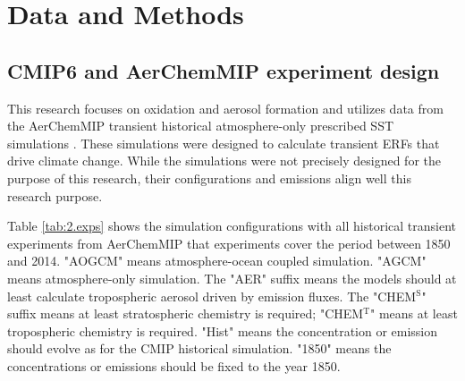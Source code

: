 
\chapter{Data and Methods}

\ifpdf
    \graphicspath{{Chapter2/Figs/Raster/}{Chapter2/Figs/PDF/}{Chapter2/Figs/}}
\else
    \graphicspath{{Chapter2/Figs/Vector/}{Chapter2/Figs/}}
\fi

\section{CMIP6 and AerChemMIP experiment design}

This research focuses on  oxidation and aerosol formation and utilizes data from the AerChemMIP transient historical atmosphere-only prescribed SST simulations \citep{collinsAerChemMIPQuantifyingEffects2017}. These simulations were designed to calculate transient ERFs that drive climate change.  While the simulations were not precisely designed for the purpose of this research, their configurations and emissions align well this research purpose.


Table \ref{tab:2.exps} shows the simulation configurations with all historical transient experiments from AerChemMIP that experiments cover the period between 1850 and 2014. "AOGCM" means atmosphere-ocean coupled simulation. "AGCM" means atmosphere-only simulation. The "AER" suffix means the models should at least calculate tropospheric aerosol driven by emission fluxes. The "CHEM$^\text{S}$" suffix means at least stratospheric chemistry is required; "CHEM$^\text{T}$" means at least tropospheric chemistry is required. "Hist" means the concentration or emission should evolve as for the CMIP historical simulation. "1850" means the concentrations or emissions should be fixed to the year 1850. 

